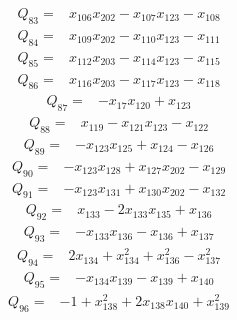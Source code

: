 {%
\begin{align*}
 Q_{83}={}&x_{106}x_{202} -x_{107}x_{123} -x_{108}
\end{align*}
\begin{align*}
 Q_{84}={}&x_{109}x_{202} -x_{110}x_{123} -x_{111}
\end{align*}
\begin{align*}
 Q_{85}={}&x_{112}x_{203} -x_{114}x_{123} -x_{115}
\end{align*}
\begin{align*}
 Q_{86}={}&x_{116}x_{203} -x_{117}x_{123} -x_{118}
\end{align*}
\begin{align*}
 Q_{87}={}&-x_{17}x_{120} +x_{123}
\end{align*}
\begin{align*}
 Q_{88}={}&x_{119} -x_{121}x_{123} -x_{122}
\end{align*}
\begin{align*}
 Q_{89}={}&-x_{123}x_{125} +x_{124} -x_{126}
\end{align*}
\begin{align*}
 Q_{90}={}&-x_{123}x_{128} +x_{127}x_{202} -x_{129}
\end{align*}
\begin{align*}
 Q_{91}={}&-x_{123}x_{131} +x_{130}x_{202} -x_{132}
\end{align*}
\begin{align*}
 Q_{92}={}&x_{133} -2x_{133}x_{135} +x_{136}
\end{align*}
\begin{align*}
 Q_{93}={}&-x_{133}x_{136} -x_{136} +x_{137}
\end{align*}
\begin{align*}
 Q_{94}={}&2x_{134} +x_{134}^{2} +x_{136}^{2} -x_{137}^{2}
\end{align*}
\begin{align*}
 Q_{95}={}&-x_{134}x_{139} -x_{139} +x_{140}
\end{align*}
\begin{align*}
 Q_{96}={}&-1 +x_{138}^{2} +2x_{138}x_{140} +x_{139}^{2}

\end{align*}}
